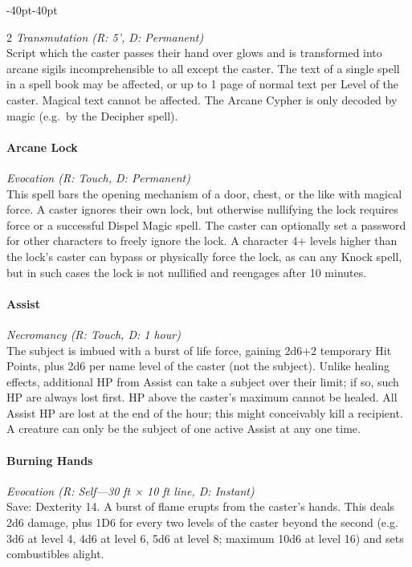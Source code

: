 \documentclass{book}
\begin{document}
\begin{adjustwidth}{-40pt}{-40pt}
\begin{multicols}{2}
\emph{Transmutation (R: 5', D: Permanent)}\\
Script which the caster passes their hand over glows and is transformed
into arcane sigils incomprehensible to all except the caster. The text
of a single spell in a spell book may be affected, or up to 1 page of
normal text per Level of the caster. Magical text cannot be affected.
The Arcane Cypher is only decoded by magic (e.g.~by the Decipher spell).

\paragraph{Arcane Lock}\label{arcane-lock}

\emph{Evocation (R: Touch, D: Permanent)}\\
This spell bars the opening mechanism of a door, chest, or the like with
magical force. A caster ignores their own lock, but otherwise nullifying
the lock requires force or a successful Dispel Magic spell. The caster
can optionally set a password for other characters to freely ignore the
lock. A character 4+ levels higher than the lock's caster can bypass or
physically force the lock, as can any Knock spell, but in such cases the
lock is not nullified and reengages after 10 minutes.

\paragraph{Assist}\label{assist}

\emph{Necromancy (R: Touch, D: 1 hour)}\\
The subject is imbued with a burst of life force, gaining 2d6+2
temporary Hit Points, plus 2d6 per name level of the caster (not the
subject). Unlike healing effects, additional HP from Assist can take a
subject over their limit; if so, such HP are always lost first. HP above
the caster's maximum cannot be healed. All Assist HP are lost at the end
of the hour; this might conceivably kill a recipient. A creature can
only be the subject of one active Assist at any one time.

\paragraph{Burning Hands}\label{burning-hands}

\emph{Evocation (R: Self---30 ft × 10 ft line, D: Instant)}\\
Save: Dexterity 14. A burst of flame erupts from the caster's hands.
This deals 2d6 damage, plus 1D6 for every two levels of the caster
beyond the second (e.g. 3d6 at level 4, 4d6 at level 6, 5d6 at level 8;
maximum 10d6 at level 16) and sets combustibles alight.


\end{multicols}
\end{adjustwidth}
\end{document}
